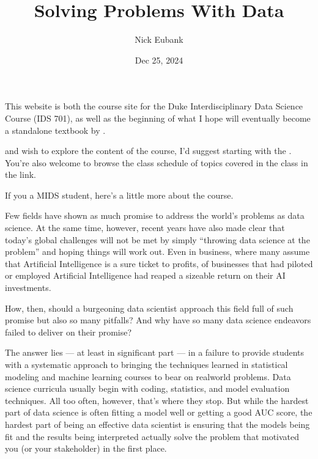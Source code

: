\documentclass[letterpaper,10pt,english]{jupyterBook}
\title{Solving Problems With Data}
\date{Dec 25, 2024}
\author{Nick Eubank}
\begin{document}
\pagestyle{empty}
\sphinxmaketitle
\pagestyle{plain}
\sphinxtableofcontents
\pagestyle{normal}
\label{\detokenize{landing_page::doc}}


\sphinxAtStartPar
This website is both the course site for the Duke Interdisciplinary Data Science Course  (IDS 701), as well as the beginning of what I hope will eventually become a stand\sphinxhyphen{}alone textbook by .

\sphinxAtStartPar
{} and wish to explore the content of the course, I’d suggest starting with the {\hyperref[\detokenize{10_introduction/10_solving_problems_with_data::doc}]{}}. You’re also welcome to browse the class schedule of topics covered in the class in the {\hyperref[\detokenize{00_class_schedule/class_schedule::doc}]{}} link.

\sphinxAtStartPar
If you  a MIDS student, here’s a little more about the course.

\begin{DUlineblock}{0em}
\item[] 
\end{DUlineblock}

\sphinxAtStartPar
Few fields have shown as much promise to address the world’s problems as data science. At the same time, however, recent years have also made clear that today’s global challenges will not be met by simply “throwing data science at the problem” and hoping things will work out. Even in business, where many assume that Artificial Intelligence is a sure ticket to profits,  of businesses that had piloted or employed Artificial Intelligence had reaped a sizeable return on their AI investments.

\sphinxAtStartPar
How, then, should a burgeoning data scientist approach this field full of such promise but also so many pitfalls? And why have so many data science endeavors failed to deliver on their promise?

\sphinxAtStartPar
The answer lies — at least in significant part — in a failure to provide students with a systematic approach to bringing the techniques learned in statistical modeling and machine learning courses to bear on real\sphinxhyphen{}world problems. Data science curricula usually begin with coding, statistics, and model evaluation techniques. All too often, however, that’s where they stop. But while the hardest part of data science  is often fitting a model well or getting a good AUC score, the hardest part of being an effective  data scientist is ensuring that the models being fit and the results being interpreted actually solve the problem that motivated you (or your stakeholder) in the first place.
\end{document}
